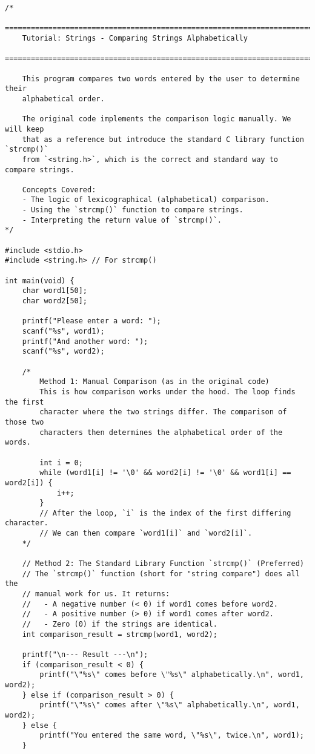 \documentclass[11pt]{book}
\begin{document}
\begin{verbatim}
/*
    ================================================================================
    Tutorial: Strings - Comparing Strings Alphabetically
    ================================================================================

    This program compares two words entered by the user to determine their
    alphabetical order.

    The original code implements the comparison logic manually. We will keep
    that as a reference but introduce the standard C library function `strcmp()`
    from `<string.h>`, which is the correct and standard way to compare strings.

    Concepts Covered:
    - The logic of lexicographical (alphabetical) comparison.
    - Using the `strcmp()` function to compare strings.
    - Interpreting the return value of `strcmp()`.
*/

#include <stdio.h>
#include <string.h> // For strcmp()

int main(void) {
    char word1[50];
    char word2[50];

    printf("Please enter a word: ");
    scanf("%s", word1);
    printf("And another word: ");
    scanf("%s", word2);

    /*
        Method 1: Manual Comparison (as in the original code)
        This is how comparison works under the hood. The loop finds the first
        character where the two strings differ. The comparison of those two
        characters then determines the alphabetical order of the words.

        int i = 0;
        while (word1[i] != '\0' && word2[i] != '\0' && word1[i] == word2[i]) {
            i++;
        }
        // After the loop, `i` is the index of the first differing character.
        // We can then compare `word1[i]` and `word2[i]`.
    */

    // Method 2: The Standard Library Function `strcmp()` (Preferred)
    // The `strcmp()` function (short for "string compare") does all the
    // manual work for us. It returns:
    //   - A negative number (< 0) if word1 comes before word2.
    //   - A positive number (> 0) if word1 comes after word2.
    //   - Zero (0) if the strings are identical.
    int comparison_result = strcmp(word1, word2);

    printf("\n--- Result ---\n");
    if (comparison_result < 0) {
        printf("\"%s\" comes before \"%s\" alphabetically.\n", word1, word2);
    } else if (comparison_result > 0) {
        printf("\"%s\" comes after \"%s\" alphabetically.\n", word1, word2);
    } else {
        printf("You entered the same word, \"%s\", twice.\n", word1);
    }


\end{verbatim}
\end{document}
